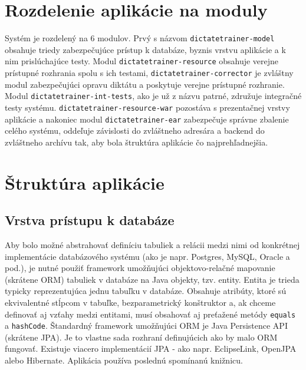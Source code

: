 \documentclass[12pt,oneside]{fithesis2}
\begin{document}
	\pagebreak
	   	\section{Rozdelenie aplikácie na moduly}
      	\par Systém je rozdelený na 6 modulov. Prvý s názvom \texttt{dictatetrainer-model} obsahuje triedy zabezpečujúce prístup k databáze, byznis vrstvu aplikácie a k nim prislúchajúce testy. Modul \texttt{dictatetrainer-resource} obsahuje verejne prístupné rozhrania spolu s ich testami, \texttt{dictatetrainer-corrector} je zvláštny modul zabezpečujúci opravu diktátu a poskytuje verejne prístupné rozhranie. Modul \texttt{dictatetrainer-int-tests}, ako je už z názvu patrné, združuje integračné testy systému. \texttt{dictatetrainer-resource-war} pozostáva s prezentačnej vrstvy aplikácie a nakoniec modul \texttt{dictatetrainer-ear} zabezpečuje správne zbalenie celého systému, oddeľuje závislosti do zvláštneho adresára a backend do zvláštneho archívu tak, aby bola štruktúra aplikácie čo najprehľadnejšia.
    \section{Štruktúra aplikácie}
          \subsection{Vrstva prístupu k databáze}
      
      \par Aby bolo možné abstrahovať definíciu tabuliek a relácii medzi nimi od konkrétnej implementácie databázového systému (ako je napr. Postgres, MySQL, Oracle a pod.), je nutné použiť framework umožňujúci objektovo-relačné mapovanie (skrátene ORM) tabuliek v databáze na Java objekty, tzv. entity. Entita je trieda typicky reprezentujúca jednu tabuľku v databáze. Obsahuje atribúty, ktoré sú ekvivalentné stĺpcom v tabuľke, bezparametrický konštruktor a, ak chceme definovať aj vzťahy medzi entitami, musí obsahovať aj preťažené metódy \texttt{equals} a \texttt{hashCode}. Štandardný framework umožňujúci ORM je Java Persistence API (skrátene JPA). Je to vlastne sada rozhraní definujúcich ako by malo ORM fungovať. Existuje viacero implementácií JPA - ako napr. EclipseLink, OpenJPA alebo Hibernate. Aplikácia používa poslednú spomínanú knižnicu.
      
\end{document}
